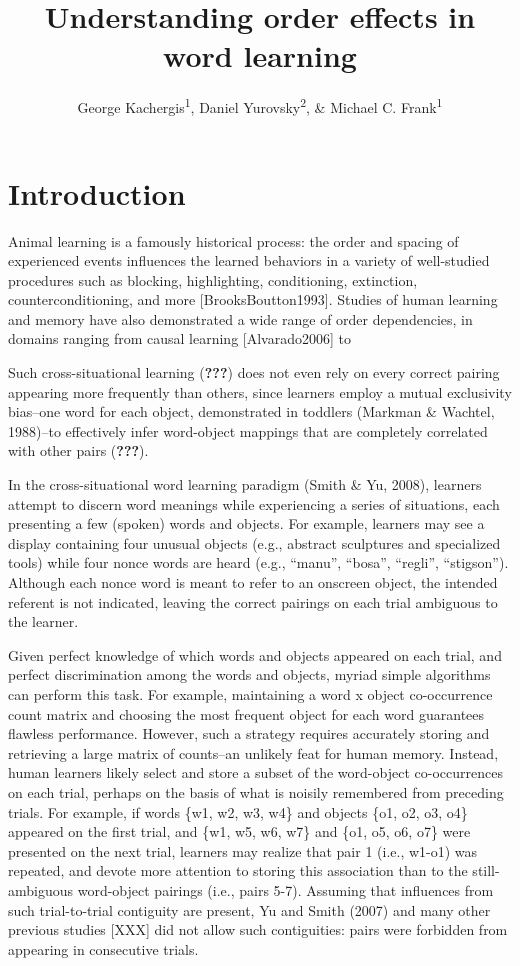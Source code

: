 \documentclass[man,floatsintext]{apa6}
\title{Understanding order effects in word learning}
\author{George Kachergis\textsuperscript{1}, Daniel Yurovsky\textsuperscript{2}, \& Michael C. Frank\textsuperscript{1}}
\date{}
\affiliation{
\vspace{0.5cm}
\textsuperscript{1} Department of Psychology, Stanford University\\\textsuperscript{2} Department of Psychology, Carnegie Mellon University}
\begin{document}
\maketitle

\hypertarget{introduction}{%
\section{Introduction}\label{introduction}}

Animal learning is a famously historical process: the order and spacing of experienced events influences the learned behaviors in a variety of well-studied procedures such as blocking, highlighting, conditioning, extinction, counterconditioning, and more {[}BrooksBoutton1993{]}.
Studies of human learning and memory have also demonstrated a wide range of order dependencies, in domains ranging from causal learning {[}Alvarado2006{]} to

Such cross-situational learning ({\textbf{???}}) does not even rely on every correct pairing appearing more frequently than others, since learners employ a mutual exclusivity bias--one word for each object, demonstrated in toddlers (Markman \& Wachtel, 1988)--to effectively infer word-object mappings that are completely correlated with other pairs ({\textbf{???}}).

In the cross-situational word learning paradigm (Smith \& Yu, 2008), learners attempt to discern word meanings while experiencing a series of situations, each presenting a few (spoken) words and objects.
For example, learners may see a display containing four unusual objects (e.g., abstract sculptures and specialized tools) while four nonce words are heard (e.g., \enquote{manu}, \enquote{bosa}, \enquote{regli}, \enquote{stigson}).
Although each nonce word is meant to refer to an onscreen object, the intended referent is not indicated, leaving the correct pairings on each trial ambiguous to the learner.

Given perfect knowledge of which words and objects appeared on each trial, and perfect discrimination among the words and objects, myriad simple algorithms can perform this task.
For example, maintaining a word x object co-occurrence count matrix and choosing the most frequent object for each word guarantees flawless performance.
However, such a strategy requires accurately storing and retrieving a large matrix of counts--an unlikely feat for human memory.
Instead, human learners likely select and store a subset of the word-object co-occurrences on each trial, perhaps on the basis of what is noisily remembered from preceding trials.
For example, if words \{w1, w2, w3, w4\} and objects \{o1, o2, o3, o4\} appeared on the first trial, and \{w1, w5, w6, w7\} and \{o1, o5, o6, o7\} were presented on the next trial, learners may realize that pair 1 (i.e., w1-o1) was repeated, and devote more attention to storing this association than to the still-ambiguous word-object pairings (i.e., pairs 5-7).
Assuming that influences from such trial-to-trial contiguity are present, Yu and Smith (2007) and many other previous studies {[}XXX{]} did not allow such contiguities: pairs were forbidden from appearing in consecutive trials.
\end{document}
